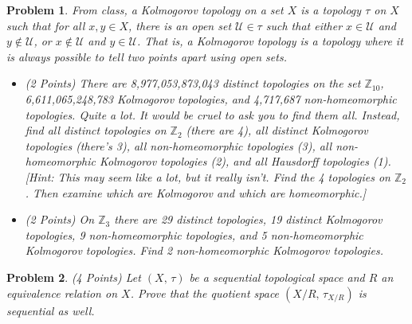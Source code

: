\documentclass{article}
\theoremstyle{normal}
\newtheorem{problem}{Problem}
\begin{document}
    \begin{problem}
        From class, a Kolmogorov topology on a set $X$ is a topology
        $\tau$ on $X$ such that for all $x,y\in{X}$, there is an open set
        $\mathcal{U}\in\tau$ such that either $x\in\mathcal{U}$ and
        $y\notin\mathcal{U}$, or $x\notin\mathcal{U}$ and $y\in\mathcal{U}$.
        That is, a Kolmogorov topology is a topology where it is always possible
        to tell two points apart using open sets.
        \begin{itemize}
            \item (2 Points)
                There are 8,977,053,873,043 distinct topologies on the set
                $\mathbb{Z}_{10}$, 6,611,065,248,783 Kolmogorov topologies,
                and 4,717,687 non-homeomorphic topologies. Quite a lot. It
                would be cruel to ask you to find them all. Instead, find all
                distinct topologies on $\mathbb{Z}_{2}$ (there are 4), all
                distinct Kolmogorov topologies (there's 3), all non-homeomorphic
                topologies (3), all non-homeomorphic Kolmogorov topologies
                (2), and all Hausdorff topologies (1). [Hint: This may seem
                like a lot, but it really isn't. Find the 4 topologies on
                $\mathbb{Z}_{2}$. Then examine which are Kolmogorov and which
                are homeomorphic.]
            \item (2 Points)
                On $\mathbb{Z}_{3}$ there are 29 distinct topologies, 19
                distinct Kolmogorov topologies, 9 non-homeomorphic topologies,
                and 5 non-homeomorphic Kolmogorov topologies. Find 2
                non-homeomorphic Kolmogorov topologies.
        \end{itemize}
    \end{problem}
    \begin{problem}
        (4 Points) Let $(X,\,\tau)$ be a sequential topological space and $R$ an
        equivalence relation on $X$. Prove that the quotient space
        $(X/R,\,\tau_{X/R})$ is sequential as well.
    \end{problem}
\end{document}

